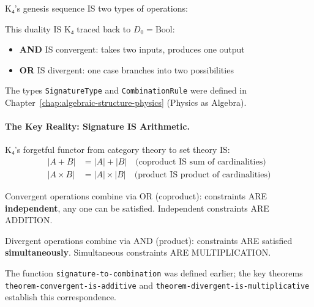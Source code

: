 \documentclass[11pt,a4paper]{book}
\begin{document}
K₄'s genesis sequence IS two types of operations:

\begin{center}
\end{center}

This duality IS K₄ traced back to $D_0 = \text{Bool}$:

\begin{itemize}
\item \textbf{AND} IS convergent: takes two inputs, produces one output
\item \textbf{OR} IS divergent: one case branches into two possibilities
\end{itemize}

The types \verb|SignatureType| and \verb|CombinationRule| were defined in 
Chapter~\ref{chap:algebraic-structure-physics} (Physics as Algebra).

\paragraph{The Key Reality: Signature IS Arithmetic.}

K₄'s forgetful functor from category theory to set theory IS:
\begin{align*}
|A + B| &= |A| + |B| \quad \text{(coproduct IS sum of cardinalities)} \\
|A \times B| &= |A| \times |B| \quad \text{(product IS product of cardinalities)}
\end{align*}

Convergent operations combine via OR (coproduct): constraints ARE 
\textbf{independent}, any one can be satisfied. Independent constraints ARE ADDITION.

Divergent operations combine via AND (product): constraints ARE 
satisfied \textbf{simultaneously}. Simultaneous constraints ARE MULTIPLICATION.

The function \verb|signature-to-combination| was defined earlier; the key 
theorems \verb|theorem-convergent-is-additive| and 
\verb|theorem-divergent-is-multiplicative| establish this correspondence.
\end{document}
